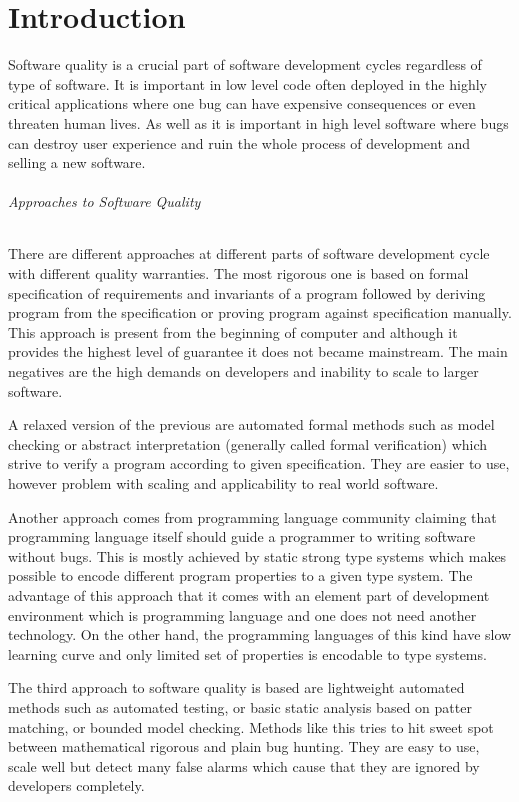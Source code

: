 \chapter{Introduction}
\label{intro}

Software quality is a crucial part of software development cycles
regardless of type of software.
It is important in low level code often deployed in the highly critical
applications where one bug can have expensive consequences or even threaten
human lives.
As well as it is important in high level software where bugs can destroy
user experience and ruin the whole process of development and selling a new software.

\subparagraph{Approaches to Software Quality}
There are different approaches at different parts of software development cycle
with different quality warranties.
The most rigorous one is based on formal specification of requirements and invariants
of a program followed by deriving program from the specification or proving program
against specification manually.
This approach is present from the beginning of computer and although it provides
the highest level of guarantee it does not became mainstream.
The main negatives are the high demands on developers and inability to scale
to larger software.

A relaxed version of the previous are automated formal methods such as
model checking or abstract interpretation (generally called formal verification)
which strive to verify
a program according to given specification. They are easier to use,
however problem with scaling and applicability to real world software. 

Another approach comes from programming language community claiming
that programming language itself should guide a programmer to writing
software without bugs.
This is mostly achieved by static strong type systems which makes possible to
encode different program properties to a given type system.
The advantage of this approach that it comes with an element part of development
environment which is programming language and one does not need another technology.
On the other hand, the programming languages of this kind have slow learning curve
and only limited set of properties is encodable to type systems.

The third approach to software quality is based are lightweight automated methods
such as automated testing, or basic static analysis based on patter matching, or bounded model checking.
Methods like this tries to hit sweet spot between mathematical rigorous and plain bug hunting.
They are easy to use, scale well but detect many false alarms which cause
that they are ignored by developers completely.

